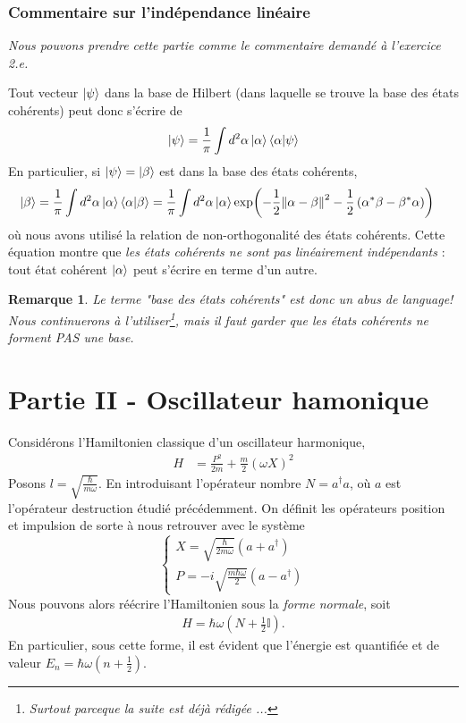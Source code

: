 \documentclass[11pt,oneside,a4paper]{article}
\newcommand{\h}{\ensuremath{\hbar}}
\newtheorem{remark}[theorem]{Remarque}
\begin{document}
\subsubsection{Commentaire sur l'indépendance linéaire}
\emph{Nous pouvons prendre cette partie comme le commentaire demandé à l'exercice 2.e.}

Tout vecteur $\ket{\psi}$ dans la base de Hilbert (dans laquelle se trouve la base des états cohérents) peut donc s'écrire de
\begin{align}
  \ket{\psi} = \frac{1}{\pi}\int d^2\alpha \ket{\alpha}\braket{\alpha}{\psi}
\end{align} 
En particulier, si $\ket{\psi} = \ket{\beta}$ est dans la base des états cohérents, 
\begin{align}
  \ket{\beta} &= \frac{1}{\pi} \int d^2\alpha \ket{\alpha}\braket{\alpha}{\beta} = \frac{1}{\pi} \int d^2\alpha \ket{\alpha} \exp(-\frac{1}{2}\norm{\alpha-\beta}^2-\frac{1}{2}\left(\alpha^*\beta-\beta^*\alpha\right))
\end{align}
où nous avons utilisé la relation de non-orthogonalité des états cohérents. Cette équation montre que \emph{les états cohérents ne sont pas linéairement indépendants} : tout état cohérent $\ket{\alpha}$ peut s'écrire en terme d'un autre.

\begin{remark}
  Le terme "base des états cohérents" est donc un abus de language! Nous continuerons à l'utiliser\footnote{Surtout parceque la suite est déjà rédigée ...}, mais il faut garder que les états cohérents ne forment PAS une base.
\end{remark}

\section{Partie II - Oscillateur hamonique}
\label{part 2}
Considérons l'Hamiltonien classique d'un oscillateur harmonique, 
\begin{align}
  \label{Hamiltonien OH}
  H &= \frac{P^2}{2m} + \frac{m}{2}\left(\omega X\right)^2
\end{align}
Posons $l = \sqrt{\frac{\h}{m\omega}}$. En introduisant l'opérateur nombre $N = a^\dagger a$, où $a$ est l'opérateur destruction étudié précédemment. On définit les opérateurs position et impulsion de sorte à nous retrouver avec le système
\begin{equation}
  \begin{cases}
    X = \sqrt{\frac{\h}{2m\omega}}\left(a+a^\dagger\right)\\
    P = -i\sqrt{\frac{m\h\omega}{2}}\left(a-a^\dagger\right)
  \end{cases}
  \label{P and X}
\end{equation}
Nous pouvons alors réécrire l'Hamiltonien sous la \emph{forme normale}, soit 
\begin{align}
  \label{Hamiltonien OH normale}
  H = \h\omega\left(N+\frac{1}{2}\mathbb{I}\right).
\end{align}
En particulier, sous cette forme, il est évident que l'énergie est quantifiée et de valeur $E_n = \h\omega\left(n+\frac{1}{2}\right)$.
\end{document}
